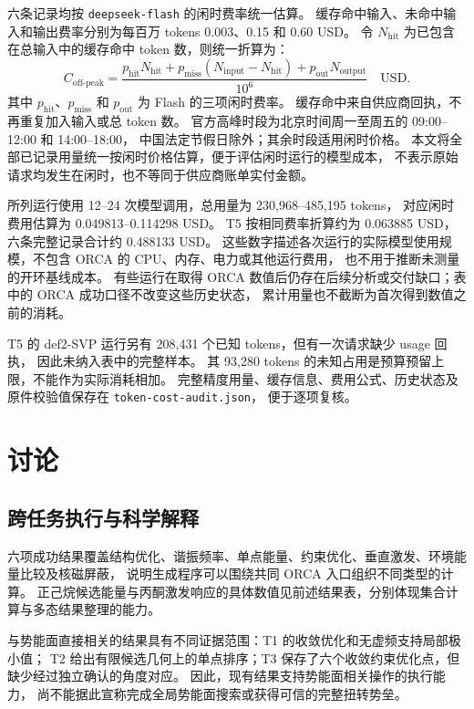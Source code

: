 \documentclass[UTF8,fontset=fandol,a4paper,11pt]{ctexart}
\newcommand{\code}[1]{\texttt{#1}}
\begin{document}
六条记录均按 \code{deepseek-flash} 的闲时费率统一估算。%
缓存命中输入、未命中输入和输出费率分别为每百万 tokens 0.003、0.15 和 0.60 USD\cite{deepseekpricing}。%
令 $N_{\mathrm{hit}}$ 为已包含在总输入中的缓存命中 token 数，则统一折算为：
\begin{equation}
  C_{\mathrm{off\text{-}peak}}=
  \frac{p_{\mathrm{hit}}N_{\mathrm{hit}}
  +p_{\mathrm{miss}}(N_{\mathrm{input}}-N_{\mathrm{hit}})
  +p_{\mathrm{out}}N_{\mathrm{output}}}{10^6}
  \quad\text{USD}.
  \label{eq:token-cost}
\end{equation}
其中 $p_{\mathrm{hit}}$、$p_{\mathrm{miss}}$ 和 $p_{\mathrm{out}}$ 为 Flash 的三项闲时费率。%
缓存命中来自供应商回执，不再重复加入输入或总 token 数。%
官方高峰时段为北京时间周一至周五的 09:00--12:00 和 14:00--18:00，%
中国法定节假日除外；其余时段适用闲时价格。%
本文将全部已记录用量统一按闲时价格估算，便于评估闲时运行的模型成本，%
不表示原始请求均发生在闲时，也不等同于供应商账单实付金额。

所列运行使用 12--24 次模型调用，总用量为 230,968--485,195 tokens，%
对应闲时费用估算为 0.049813--0.114298 USD。%
T5 按相同费率折算约为 0.063885 USD，六条完整记录合计约 0.488133 USD。%
这些数字描述各次运行的实际模型使用规模，不包含 ORCA 的 CPU、内存、电力或其他运行费用，%
也不用于推断未测量的开环基线成本。%
有些运行在取得 ORCA 数值后仍存在后续分析或交付缺口；表中的 ORCA 成功口径不改变这些历史状态，%
累计用量也不截断为首次得到数值之前的消耗。

T5 的 def2-SVP 运行另有 208,431 个已知 tokens，但有一次请求缺少 usage 回执，%
因此未纳入表中的完整样本。%
其 93,280 tokens 的未知占用是预算预留上限，不能作为实际消耗相加。%
完整精度用量、缓存信息、费用公式、历史状态及原件校验值保存在 \code{token-cost-audit.json}，%
便于逐项复核。

\section{讨论}
\subsection{跨任务执行与科学解释}
六项成功结果覆盖结构优化、谐振频率、单点能量、约束优化、垂直激发、环境能量比较及核磁屏蔽，%
说明生成程序可以围绕共同 ORCA 入口组织不同类型的计算。%
正己烷候选能量与丙酮激发响应的具体数值见前述结果表，分别体现集合计算与多态结果整理的能力。

与势能面直接相关的结果具有不同证据范围：T1 的收敛优化和无虚频支持局部极小值；%
T2 给出有限候选几何上的单点排序；T3 保存了六个收敛约束优化点，但缺少经过独立确认的角度对应。%
因此，现有结果支持势能面相关操作的执行能力，%
尚不能据此宣称完成全局势能面搜索或获得可信的完整扭转势垒。
\end{document}
